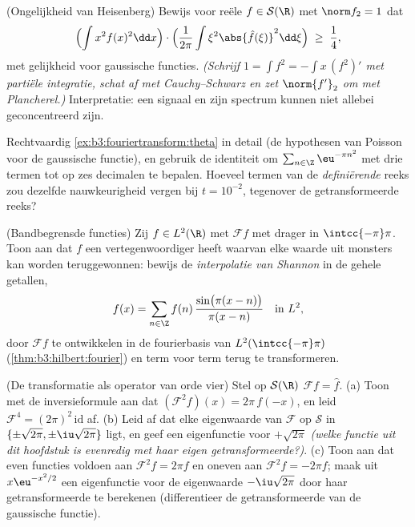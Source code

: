 \begin{exercise}[$\star\star\star$]\label{exo:b3:fouriertransform:8}
(Ongelijkheid van Heisenberg) Bewijs voor reële $f \in \mathcal
S(\R)$ met $\norm f_2 = 1$ dat
\[
\Bigl(\int x^2f(x)^2\dd x\Bigr)\cdot
\Bigl(\frac1{2\pi}\int \xi^2\abs{\hat f(\xi)}^2\dd\xi\Bigr)
\;\geq\; \frac14 ,
\]
met gelijkheid voor gaussische functies. \emph{(Schrijf $1 = \int
f^2 = -\int x\,(f^2)'$ met partiële integratie, schat af met
Cauchy--Schwarz en zet $\norm{f'}_2$ om met Plancherel.)}
Interpretatie: een signaal en zijn spectrum kunnen niet allebei
geconcentreerd zijn.
\end{exercise}

\begin{exercise}[$\star\star$]\label{exo:b3:fouriertransform:9}
Rechtvaardig \cref{ex:b3:fouriertransform:theta} in detail (de
hypothesen van Poisson voor de gaussische functie), en gebruik de
identiteit om $\sum_{n\in\Z}\eu^{-\pi n^2}$ met drie termen tot
op zes decimalen te bepalen. Hoeveel termen van de
\emph{definiërende} reeks zou dezelfde nauwkeurigheid vergen bij
$t = 10^{-2}$, tegenover de getransformeerde reeks?
\end{exercise}

\begin{exercise}[$\star\star$]\label{exo:b3:fouriertransform:10}
(Bandbegrensde functies) Zij $f \in L^2(\R)$ met $\mathcal Ff$
met drager in $\intcc{-\pi}\pi$. Toon aan dat $f$ een
vertegenwoordiger heeft waarvan elke waarde uit monsters kan
worden teruggewonnen: bewijs de \emph{interpolatie van Shannon}
in de gehele getallen,
\[
f(x) = \sum_{n\in\Z} f(n)\,
\frac{\sin\bigl(\pi(x - n)\bigr)}{\pi(x - n)}
\quad\text{in } L^2,
\]
door $\mathcal Ff$ te ontwikkelen in de fourierbasis van
$L^2(\intcc{-\pi}\pi)$ (\cref{thm:b3:hilbert:fourier}) en term
voor term terug te transformeren.
\end{exercise}

\begin{exercise}[$\star\star$]\label{exo:b3:fouriertransform:11}
(De transformatie als operator van orde vier) Stel op $\mathcal
S(\R)$ $\mathcal F f = \hat f$.
(a) Toon met de inversieformule aan dat $(\mathcal F^2f)(x) =
2\pi\,f(-x)$, en leid $\mathcal F^4 = (2\pi)^2\, \mathrm{id}$
af.
(b) Leid af dat elke eigenwaarde van $\mathcal F$ op $\mathcal S$
in $\{\pm\sqrt{2\pi}, \pm\iu\sqrt{2\pi}\}$ ligt, en geef een
eigenfunctie voor $+\sqrt{2\pi}$ \emph{(welke functie uit dit
hoofdstuk is evenredig met haar eigen getransformeerde?)}.
(c) Toon aan dat even functies voldoen aan $\mathcal F^2f = 2\pi
f$ en oneven aan $\mathcal F^2f = -2\pi f$; maak uit
$x\eu^{-x^2/2}$ een eigenfunctie voor de eigenwaarde
$-\iu\sqrt{2\pi}$ door haar getransformeerde te berekenen
(differentieer de getransformeerde van de gaussische functie).
\end{exercise}

